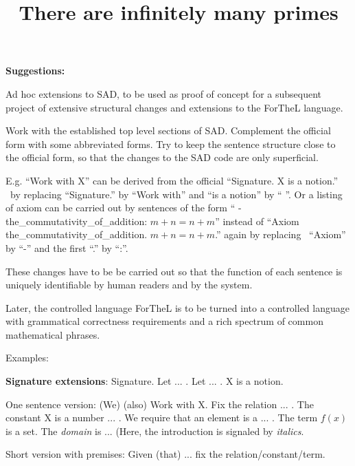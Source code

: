\documentclass{letter}
\newcommand{\section}[1]{\medskip\bigskip

\noindent\textbf{\LARGE #1}}
\newcommand{\tmem}[1]{{\em #1\/}}
\newcommand{\tmstrong}[1]{\textbf{#1}}
\begin{document}
\title{There are infinitely many primes}\author{}\maketitle
















\section{Suggestions:}

Ad hoc extensions to SAD, to be used as proof of concept for a subsequent
project of extensive structural changes and extensions to the ForTheL
language.

Work with the established top level sections of SAD. Complement the official
form with some abbreviated forms. Try to keep the sentence structure close to
the official form, so that the changes to the SAD code are only superficial.

E.g. ``Work with X'' can be derived from the official ``Signature. X is a
notion.'' \ by replacing ``Signature.'' by ``Work with'' and ``is a notion''
by `` ''. Or a listing of axiom can be carried out by sentences of the form ``
- the\_commutativity\_of\_addition: $m + n = n + m$'' instead of ``Axiom
the\_commutativity\_of\_addition. $m + n = n + m$.'' again by replacing \
``Axiom'' by ``-'' and the first ``.'' by ``:''.

These changes have to be be carried out so that the function of each sentence
is uniquely identifiable by human readers and by the system.

Later, the controlled language ForTheL is to be turned into a controlled
language with grammatical correctness requirements and a rich spectrum of
common mathematical phrases.

Examples:

{\tmstrong{Signature extensions}}: Signature. Let ... . Let ... . X is a
notion.

One sentence version: (We) (also) Work with X. Fix the relation ... . The
constant X is a number ... . We require that an element is a ... . The term $f
\left( x \right)$ is a set. The {\tmem{domain}} is ... (Here, the introduction
is signaled by {\tmem{italics}}.

Short version with premises: Given (that) ... fix the relation/constant/term.
\end{document}
